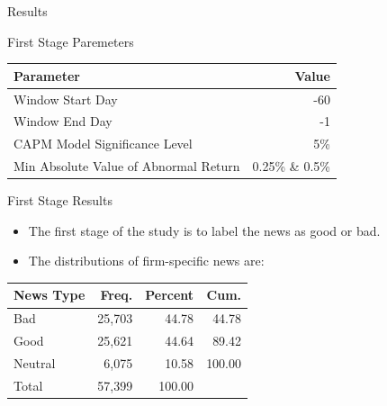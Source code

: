 \documentclass{beamer}
\begin{document}
\begin{frame}
    \Huge
    \center
    Results
\end{frame}

\begin{frame}{First Stage Paremeters}
    \centering
    \begin{tabular}{lr}
        \toprule
        Parameter                             & Value           \\
        \midrule
        Window Start Day                      & -60             \\
        Window End Day                        & -1              \\
        CAPM Model Significance Level         & 5\%             \\
        Min Absolute Value of Abnormal Return & 0.25\% \& 0.5\% \\
        \bottomrule
    \end{tabular}
\end{frame}



\begin{frame}{First Stage Results}
    \begin{itemize}
        \item The first stage of the study is to label the news as good or bad.
        \item The distributions of firm-specific news are:
    \end{itemize}
    \center
    \begin{tabular}{lrrr}
        \toprule
        News Type & Freq.  & Percent & Cum.   \\
        \midrule
        Bad       & 25,703 & 44.78   & 44.78  \\
        Good      & 25,621 & 44.64   & 89.42  \\
        Neutral   & 6,075  & 10.58   & 100.00 \\
        \midrule
        Total     & 57,399 & 100.00  &        \\
        \bottomrule
    \end{tabular}
\end{frame}
\end{document}
